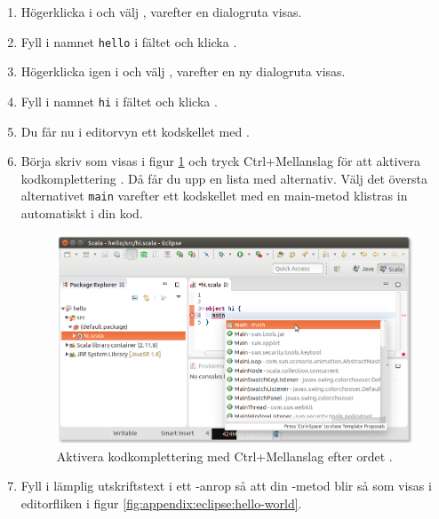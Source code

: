 \begin{enumerate}
\item Högerklicka i  och välj , varefter en dialogruta visas. 

\item Fyll i namnet \texttt{hello} i fältet  och klicka .

\item Högerklicka igen i  och välj , varefter en ny dialogruta visas. 

\item Fyll i namnet \texttt{hi} i fältet  och klicka .

\item Du får nu i editorvyn ett kodskellet med .

\item Börja skriv  som visas i figur \ref{fig:appendix:eclipse:complete-main} och tryck Ctrl+Mellanslag för att aktivera kodkomplettering . Då får du upp en lista med alternativ. Välj det översta alternativet \texttt{main} varefter ett kodskellet med en main-metod klistras in automatiskt i din kod.

\begin{figure}
\centering
\includegraphics[width=1.0\textwidth]{../img/eclipse/eclipse-complete-main.png}
\caption{Aktivera kodkomplettering med Ctrl+Mellanslag efter ordet .}
\label{fig:appendix:eclipse:complete-main}
\end{figure}

\item Fyll i lämplig utskriftstext i ett -anrop så att din -metod blir så som visas i editorfliken i figur \ref{fig:appendix:eclipse:hello-world}.


\end{enumerate}

